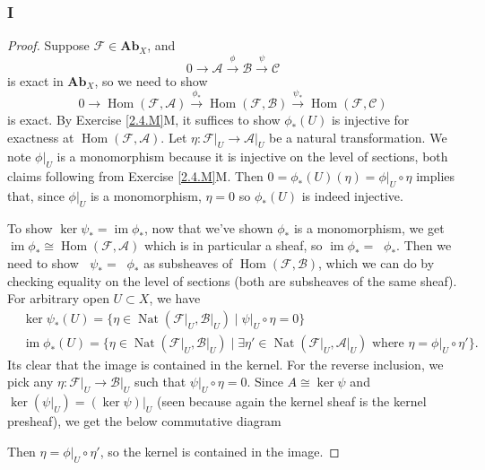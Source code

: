 \documentclass{article}
\newcommand{\fA}{\mathscr{A}}
\newcommand{\fB}{\mathscr{B}}
\newcommand{\fC}{\mathscr{C}}
\newcommand{\fF}{\mathscr{F}}
\DeclareMathOperator{\im}{im}
\DeclareMathOperator{\Hom}{Hom}
\DeclareMathOperator{\Nat}{Nat}
\DeclareMathOperator{\kerpre}{\ker_{\text{pre}}}
\DeclareMathOperator{\impre}{\im_{\text{pre}}}
\newcommand{\Ab}{\mathbf{Ab}} %
\begin{document}
\subsubsection{I}\label{2.6.I}
\begin{proof}
    Suppose $\fF\in \Ab_X$, and
    \[
    0\to \fA \xrightarrow{\phi} \fB \xrightarrow{\psi} \fC
    \]
    is exact in $\Ab_X$, so we need to show
    \[
    0 \to \Hom(\fF,\fA) \xrightarrow{\phi_*} \Hom(\fF, \fB) \xrightarrow{\psi_*} \Hom(\fF,\fC)
    \]
    is exact. By Exercise \ref{2.4.M}M, it suffices to show $\phi_*(U)$ is injective for exactness at $\Hom(\fF,\fA)$. Let $\eta:\fF\vert_U \to \fA \vert_U$ be a natural transformation. We note $\phi\vert_U$ is a monomorphism because it is injective on the level of sections, both claims following from Exercise \ref{2.4.M}M. Then $0=\phi_*(U)(\eta)=\phi\vert_U\circ \eta$ implies that, since $\phi\vert_U$ is a monomorphism,  $\eta = 0$ so $\phi_*(U)$ is indeed injective.

    To show $\ker \psi_* = \im \phi_*$, now that we've shown $\phi_*$ is a monomorphism, we get $\im \phi_* \cong \Hom(\fF, \fA)$ which is in particular a sheaf, so $\im \phi_* = \impre \phi_*$. Then we need to show $\kerpre \psi_* = \impre \phi_*$ as subsheaves of $\Hom(\fF, \fB)$, which we can do by checking equality on the level of sections (both are subsheaves of the same sheaf). For arbitrary open $U\subset X$, we have
    \begin{align*}
        &\ker \psi_*(U) = \{\eta \in \Nat(\fF\vert_U, \fB\vert_U) \mid \psi\vert_U \circ \eta = 0\}\\
        &\im \phi_*(U) = \{\eta \in \Nat(\fF \vert_U, \fB\vert_U) \mid \exists \eta' \in \Nat(\fF\vert_U,\fA\vert_U) \text{ where } \eta = \phi\vert_U \circ \eta'\}.
    \end{align*}
    Its clear that the image is contained in the kernel. For the reverse inclusion, we pick any $\eta:\fF\vert_U \to \fB\vert_U$ such that $\psi\vert_U \circ \eta = 0$. Since $A\cong \ker \psi$ and $\ker (\psi \vert_U) = (\ker \psi)\vert_U$ (seen because again the kernel sheaf is the kernel presheaf), we get the below commutative diagram
    \begin{center}
    \end{center}
    Then $\eta = \phi \vert_U \circ \eta'$, so the kernel is contained in the image.


\end{proof}
\end{document}
